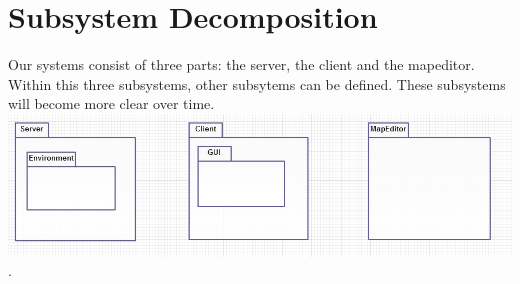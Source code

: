 \section{Subsystem Decomposition}

Our systems consist of three parts: the server, the client and the mapeditor.  Within this three subsystems, other subsytems can be defined. These subsystems will become more clear over time. \\

\includegraphics[width=\linewidth]{sub.png}.
